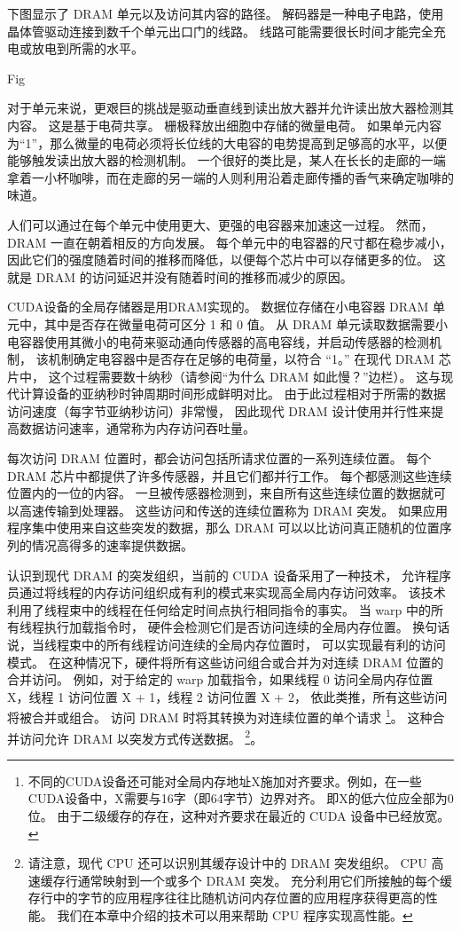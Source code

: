 \begin{remark}
下图显示了 DRAM 单元以及访问其内容的路径。 解码器是一种电子电路，使用晶体管驱动连接到数千个单元出口门的线路。 
线路可能需要很长时间才能完全充电或放电到所需的水平。

{\color{red} Fig}

对于单元来说，更艰巨的挑战是驱动垂直线到读出放大器并允许读出放大器检测其内容。 
这是基于电荷共享。 栅极释放出细胞中存储的微量电荷。 
如果单元内容为“1”，那么微量的电荷必须将长位线的大电容的电势提高到足够高的水平，以便能够触发读出放大器的检测机制。 
一个很好的类比是，某人在长长的走廊的一端拿着一小杯咖啡，而在走廊的另一端的人则利用沿着走廊传播的香气来确定咖啡的味道。

人们可以通过在每个单元中使用更大、更强的电容器来加速这一过程。 然而，DRAM 一直在朝着相反的方向发展。 
每个单元中的电容器的尺寸都在稳步减小，因此它们的强度随着时间的推移而降低，以便每个芯片中可以存储更多的位。 
这就是 DRAM 的访问延迟并没有随着时间的推移而减少的原因。
\end{remark}

CUDA设备的全局存储器是用DRAM实现的。 数据位存储在小电容器 DRAM 单元中，其中是否存在微量电荷可区分 1 和 0 值。 
从 DRAM 单元读取数据需要小电容器使用其微小的电荷来驱动通向传感器的高电容线，并启动传感器的检测机制，
该机制确定电容器中是否存在足够的电荷量，以符合 “1。” 在现代 DRAM 芯片中，
这个过程需要数十纳秒（请参阅“为什么 DRAM 如此慢？”边栏）。 这与现代计算设备的亚纳秒时钟周期时间形成鲜明对比。 
由于此过程相对于所需的数据访问速度（每字节亚纳秒访问）非常慢，
因此现代 DRAM 设计使用并行性来提高数据访问速率，通常称为内存访问吞吐量。

每次访问 DRAM 位置时，都会访问包括所请求位置的一系列连续位置。 
每个 DRAM 芯片中都提供了许多传感器，并且它们都并行工作。 每个都感测这些连续位置内的一位的内容。 
一旦被传感器检测到，来自所有这些连续位置的数据就可以高速传输到处理器。 这些访问和传送的连续位置称为 DRAM 突发。 
如果应用程序集中使用来自这些突发的数据，那么 DRAM 可以以比访问真正随机的位置序列的情况高得多的速率提供数据。

认识到现代 DRAM 的突发组织，当前的 CUDA 设备采用了一种技术，
允许程序员通过将线程的内存访问组织成有利的模式来实现高全局内存访问效率。 
该技术利用了线程束中的线程在任何给定时间点执行相同指令的事实。 当 warp 中的所有线程执行加载指令时，
硬件会检测它们是否访问连续的全局内存位置。 换句话说，当线程束中的所有线程访问连续的全局内存位置时，
可以实现最有利的访问模式。 在这种情况下，硬件将所有这些访问组合或合并为对连续 DRAM 位置的合并访问。 
例如，对于给定的 warp 加载指令，如果线程 0 访问全局内存位置 X，线程 1 访问位置 X + 1，线程 2 访问位置 X + 2，
依此类推，所有这些访问将被合并或组合。 访问 DRAM 时将其转换为对连续位置的单个请求
\footnote{不同的CUDA设备还可能对全局内存地址X施加对齐要求。例如，在一些CUDA设备中，X需要与16字（即64字节）边界对齐。 
即X的低六位应全部为0位。 由于二级缓存的存在，这种对齐要求在最近的 CUDA 设备中已经放宽。}。
这种合并访问允许 DRAM 以突发方式传送数据。
\footnote{请注意，现代 CPU 还可以识别其缓存设计中的 DRAM 突发组织。 CPU 高速缓存行通常映射到一个或多个 DRAM 突发。 
充分利用它们所接触的每个缓存行中的字节的应用程序往往比随机访问内存位置的应用程序获得更高的性能。 
我们在本章中介绍的技术可以用来帮助 CPU 程序实现高性能。}。

